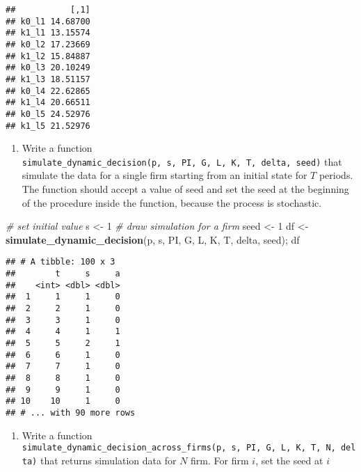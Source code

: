\documentclass[
]{book}
\newenvironment{Shaded}{\begin{snugshade}}{\end{snugshade}}
\newcommand{\CommentTok}[1]{\textcolor[rgb]{0.56,0.35,0.01}{\textit{#1}}}
\newcommand{\DecValTok}[1]{\textcolor[rgb]{0.00,0.00,0.81}{#1}}
\newcommand{\KeywordTok}[1]{\textcolor[rgb]{0.13,0.29,0.53}{\textbf{#1}}}
\newcommand{\NormalTok}[1]{#1}
\newcommand{\OperatorTok}[1]{\textcolor[rgb]{0.81,0.36,0.00}{\textbf{#1}}}
\newcommand{\StringTok}[1]{\textcolor[rgb]{0.31,0.60,0.02}{#1}}
\providecommand{\tightlist}{%
  \setlength{\itemsep}{0pt}\setlength{\parskip}{0pt}}
\begin{document}
\begin{Shaded}
\end{Shaded}

\begin{verbatim}
##           [,1]
## k0_l1 14.68700
## k1_l1 13.15574
## k0_l2 17.23669
## k1_l2 15.84887
## k0_l3 20.10249
## k1_l3 18.51157
## k0_l4 22.62865
## k1_l4 20.66511
## k0_l5 24.52976
## k1_l5 21.52976
\end{verbatim}

\begin{enumerate}
\def\labelenumi{\arabic{enumi}.}
\setcounter{enumi}{5}
\tightlist
\item
  Write a function \texttt{simulate\_dynamic\_decision(p,\ s,\ PI,\ G,\ L,\ K,\ T,\ delta,\ seed)} that simulate the data for a single firm starting from an initial state for \(T\) periods. The function should accept a value of seed and set the seed at the beginning of the procedure inside the function, because the process is stochastic.
\end{enumerate}

\begin{Shaded}
\begin{Highlighting}[]
\CommentTok{# set initial value}
\NormalTok{s <-}\StringTok{ }\DecValTok{1}
\CommentTok{# draw simulation for a firm}
\NormalTok{seed <-}\StringTok{ }\DecValTok{1}
\NormalTok{df <-}\StringTok{ }\KeywordTok{simulate_dynamic_decision}\NormalTok{(p, s, PI, G, L, K, T, delta, seed); df}
\end{Highlighting}
\end{Shaded}

\begin{verbatim}
## # A tibble: 100 x 3
##        t     s     a
##    <int> <dbl> <dbl>
##  1     1     1     0
##  2     2     1     0
##  3     3     1     0
##  4     4     1     1
##  5     5     2     1
##  6     6     1     0
##  7     7     1     0
##  8     8     1     0
##  9     9     1     0
## 10    10     1     0
## # ... with 90 more rows
\end{verbatim}

\begin{enumerate}
\def\labelenumi{\arabic{enumi}.}
\setcounter{enumi}{6}
\tightlist
\item
  Write a function \texttt{simulate\_dynamic\_decision\_across\_firms(p,\ s,\ PI,\ G,\ L,\ K,\ T,\ N,\ delta)} that returns simulation data for \(N\) firm. For firm \(i\), set the seed at \(i\)
\end{enumerate}
\end{document}
